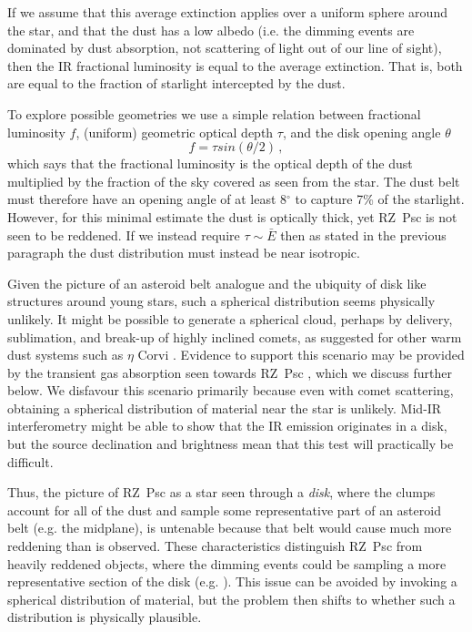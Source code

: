 \documentclass[]{rsos}
\begin{document}
If we assume that this average extinction applies over a uniform sphere around the star,
and that the dust has a low albedo (i.e. the dimming events are dominated by dust
absorption, not scattering of light out of our line of sight), then the IR fractional
luminosity is equal to the average extinction. That is, both are equal to the fraction of
starlight intercepted by the dust.

To explore possible geometries we use a simple relation between fractional luminosity
$f$, (uniform) geometric optical depth $\tau$, and the disk opening angle $\theta$
\cite{2014MNRAS.438.3299K}
\begin{equation}
  f = \tau sin(\theta/2) \, ,
\end{equation}
which says that the fractional luminosity is the optical depth of the dust multiplied by
the fraction of the sky covered as seen from the star. The dust belt must therefore have
an opening angle of at least 8$^\circ$ to capture 7\% of the starlight. However, for this
minimal estimate the dust is optically thick, yet RZ~Psc is not seen to be reddened. If
we instead require $\tau \sim \bar{E}$ then as stated in the previous paragraph the dust
distribution must instead be near isotropic.

Given the picture of an asteroid belt analogue and the ubiquity of disk like structures
around young stars, such a spherical distribution seems physically unlikely. It might be
possible to generate a spherical cloud, perhaps by delivery, sublimation, and break-up of
highly inclined comets, as suggested for other warm dust systems such as $\eta$ Corvi
\cite{2007ApJ...658..569W,2012ApJ...747...93L}. Evidence to support this scenario may be
provided by the transient gas absorption seen towards RZ~Psc \cite{2013Ap.....56..453P},
which we discuss further below. We disfavour this scenario primarily because even with
comet scattering, obtaining a spherical distribution of material near the star is
unlikely. Mid-IR interferometry might be able to show that the IR emission originates in
a disk, but the source declination and brightness mean that this test will practically be
difficult.

Thus, the picture of RZ~Psc as a star seen through a \emph{disk}, where the clumps
account for all of the dust and sample some representative part of an asteroid belt
(e.g. the midplane), is untenable because that belt would cause much more reddening than
is observed. These characteristics distinguish RZ~Psc from heavily reddened objects,
where the dimming events could be sampling a more representative section of the disk
(e.g. \cite{2015MNRAS.451...26S}). This issue can be avoided by invoking a spherical
distribution of material, but the problem then shifts to whether such a distribution is
physically plausible.
\end{document}
